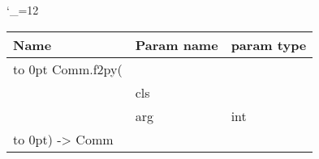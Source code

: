 \begingroup \catcode`\_=12 \tt
\begin{tabular}{lll}
\toprule
\textrm{Name}&\textrm{Param name}&\textrm{param type}\\
\midrule
\hbox to 0pt {Comm.f2py(\hss}\\
& cls\\
& arg & int\\
\hbox to 0pt{) -> Comm\hss}\\
\bottomrule
\end{tabular}
\endgroup
